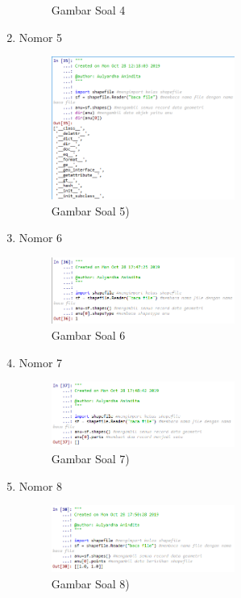 \begin{enumerate}
\begin{figure}[H]
  \centering
  \caption{Gambar Soal 4}
 \end{figure}
 \item Nomor 5
 
 \begin{figure}[H]
  \includegraphics[width=6cm]{figures/Tugas3/1174054/no5.png}
  \centering
  \caption{Gambar Soal 5)}
 \end{figure}
 \item Nomor 6
 
 \begin{figure}[H]
  \includegraphics[width=6cm]{figures/Tugas3/1174054/no6.png}
  \centering
  \caption{Gambar Soal 6}
 \end{figure}
 \item Nomor 7
 
 \begin{figure}[H]
  \includegraphics[width=6cm]{figures/Tugas3/1174054/no7.png}
  \centering
  \caption{Gambar Soal 7)}
 \end{figure}
 \item Nomor 8
 
 \begin{figure}[H]
  \includegraphics[width=6cm]{figures/Tugas3/1174054/no8.png}
  \centering
  \caption{Gambar Soal 8)}
 \end{figure}

\end{enumerate}
